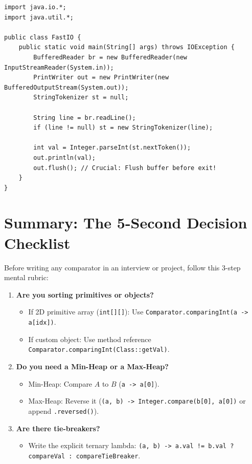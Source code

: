 \documentclass[10pt,journal,compsoc,onecolumn]{IEEEtran}
\begin{document}
\begin{verbatim}
import java.io.*;
import java.util.*;

public class FastIO {
    public static void main(String[] args) throws IOException {
        BufferedReader br = new BufferedReader(new InputStreamReader(System.in));
        PrintWriter out = new PrintWriter(new BufferedOutputStream(System.out));
        StringTokenizer st = null;

        String line = br.readLine();
        if (line != null) st = new StringTokenizer(line);

        int val = Integer.parseInt(st.nextToken());
        out.println(val);
        out.flush(); // Crucial: Flush buffer before exit!
    }
}
\end{verbatim}

\section{Summary: The 5-Second Decision Checklist}
\label{sec:checklist}

Before writing any comparator in an interview or project, follow this 3-step mental rubric:
\begin{enumerate}
    \item \textbf{Are you sorting primitives or objects?}
    \begin{itemize}
        \item If 2D primitive array (\texttt{int[][]}): Use \texttt{Comparator.comparingInt(a -> a[idx])}.
        \item If custom object: Use method reference \texttt{Comparator.comparingInt(Class::getVal)}.
    \end{itemize}
    \item \textbf{Do you need a Min-Heap or a Max-Heap?}
    \begin{itemize}
        \item Min-Heap: Compare $A$ to $B$ (\texttt{a -> a[0]}).
        \item Max-Heap: Reverse it (\texttt{(a, b) -> Integer.compare(b[0], a[0])} or append \texttt{.reversed()}).
    \end{itemize}
    \item \textbf{Are there tie-breakers?}
    \begin{itemize}
        \item Write the explicit ternary lambda: \texttt{(a, b) -> a.val != b.val ? compareVal : compareTieBreaker}.
    \end{itemize}
\end{enumerate}
\end{document}
